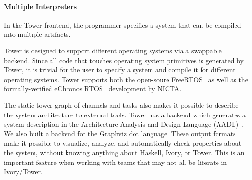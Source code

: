 \paragraph{Multiple Interpreters}


In the Tower frontend, the programmer specifies a system that can be compiled into
multiple artifacts.

Tower is designed to support different operating systems via a swappable
backend. Since all code that touches operating system primitives is generated by
Tower, it is trivial for the user to specify a system and compile it for
different operating systems. Tower supports both the open-soure
FreeRTOS~\cite{freertos} as well as the formally-verified eChronos
RTOS~\cite{echronos} development by NICTA.

The static tower graph of channels and tasks also makes it possible to
describe the system architecture to external tools. Tower has a backend which
generates a system description in the Architecture Analysis and Design Language
(AADL)~\cite{SAE:AADL}. We also built a backend for the Graphviz dot language.
These output formats make it possible to visualize, analyze, and automatically
check properties about the system, without knowing anything about Haskell,
Ivory, or Tower. This is an important feature when working with teams that may
not all be literate in Ivory/Tower.

